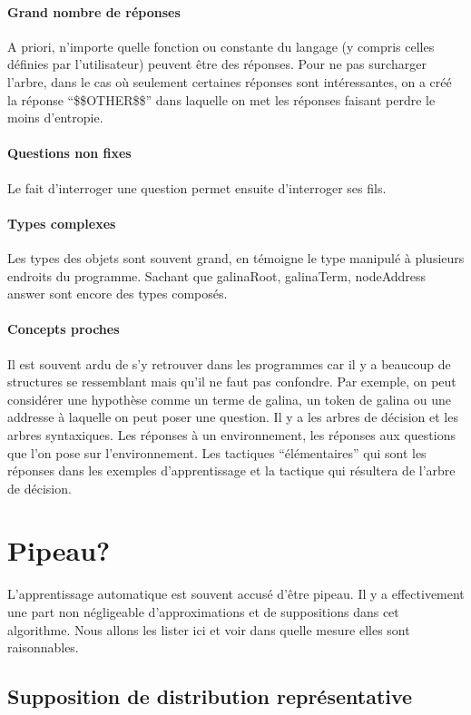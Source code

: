 \paragraph{Grand nombre de réponses} A priori, n'importe quelle fonction ou constante du langage (y compris celles définies par l'utilisateur) peuvent être des réponses. Pour ne pas surcharger l'arbre, dans le cas où seulement certaines réponses sont intéressantes, on a créé la réponse ``\$\$OTHER\$\$'' dans laquelle on met les réponses faisant perdre le moins d'entropie.
\paragraph{Questions non fixes} Le fait d'interroger une question permet ensuite d'interroger ses fils.
\paragraph{Types complexes} Les types des objets sont souvent grand, en témoigne le type 
  manipulé à plusieurs endroits du programme. Sachant que galinaRoot, galinaTerm, nodeAddress answer sont encore des types composés.
\paragraph{Concepts proches}Il est souvent ardu de s'y retrouver dans les programmes car il y a beaucoup de structures se ressemblant mais qu'il ne faut pas confondre. Par exemple, on peut considérer une hypothèse comme un terme de galina, un token de galina ou une addresse à laquelle on peut poser une question. Il y a les arbres de décision et les arbres syntaxiques. Les réponses à un environnement, les réponses aux questions que l'on pose sur l'environnement. Les tactiques ``élémentaires'' qui sont les réponses dans les exemples d'apprentissage et la tactique qui résultera de l'arbre de décision.

\section{Pipeau?}
L'apprentissage automatique est souvent accusé d'être pipeau. Il y a effectivement une part non négligeable d'approximations et de suppositions dans cet algorithme. Nous allons les lister ici et voir dans quelle mesure elles sont raisonnables.

\subsection*{Supposition de distribution représentative}


